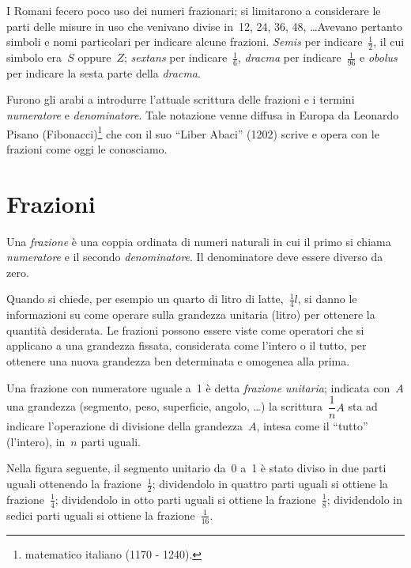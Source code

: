 I Romani fecero poco uso dei numeri frazionari; si limitarono a considerare
le parti delle misure in uso che venivano divise in~12, 24, 36, 48, \ldots Avevano
pertanto simboli e nomi particolari per indicare alcune frazioni. \emph{Semis} per
indicare~$\frac{1}{2}$, il cui simbolo era~$S$ oppure~$Z$; \emph{sextans} per indicare~$\frac{1}{6}$, \emph{dracma} per
indicare~$\frac{1}{96}$ e \emph{obolus} per indicare la sesta parte della \emph{dracma}.

Furono gli arabi a introdurre l'attuale scrittura delle
frazioni e i termini \emph{numeratore} e \emph{denominatore}. Tale notazione venne diffusa in Europa
da Leonardo Pisano (Fibonacci)\footnote{matematico italiano (1170 - 1240).} che con il suo ``Liber Abaci'' (1202) scrive e
opera con le frazioni come oggi le conosciamo.

\section{Frazioni}

\begin{definizione}
Una \emph{frazione} è una coppia ordinata di numeri naturali in cui il primo si chiama \emph{numeratore}
e il secondo \emph{denominatore}. Il denominatore deve essere diverso da zero.
\end{definizione}

\begin{center}
 
\end{center}

Quando si chiede, per esempio un quarto di litro di latte,~$\frac{1}{4}\unit{l}$, si danno le informazioni
su come operare sulla grandezza unitaria (litro) per ottenere la quantità desiderata.
Le frazioni possono essere viste come operatori che si applicano a una grandezza fissata, considerata come
l'intero o il tutto, per ottenere una nuova grandezza ben determinata e omogenea alla prima.

Una frazione con numeratore uguale a~1 è detta \emph{frazione unitaria}; indicata con~$A$ una grandezza (segmento, peso,
superficie, angolo, \ldots) la scrittura~$\dfrac{1}{n}A$ sta ad indicare l'operazione di divisione della grandezza~$A$,
intesa come il ``tutto'' (l'intero), in~$n$ parti uguali.

Nella figura seguente, il segmento unitario da~0 a~1 è stato diviso in due parti uguali ottenendo la frazione~$\frac{1}{2}$;
dividendolo in quattro parti uguali si ottiene la frazione~$\frac{1}{4}$;
dividendolo in otto parti uguali si ottiene la frazione~$\frac{1}{8}$;
dividendolo in sedici parti uguali si ottiene la frazione~$\frac{1}{16}$.

